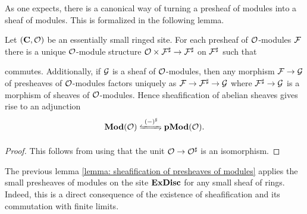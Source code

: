 As one expects, there is a canonical way of turning a presheaf of modules into a sheaf of modules. This is formalized in the following lemma.
\begin{lemma}
	\label{lemma: sheafification of presheaves of modules}
	
	Let $({{\mathbf{C}}}, {\mathcal{O}})$ be an essentially small ringed site. For each presheaf of ${\mathcal{O}}$-modules ${\mathcal{F}}$ there is a unique ${\mathcal{O}}$-module structure ${\mathcal{O}}\times {\mathcal{F}}^\sharp \to {\mathcal{F}}^\sharp$ on ${\mathcal{F}}^\sharp$ such that
	\begin{center}
	\end{center}
	commutes. Additionally, if ${\mathcal{G}}$ is a sheaf of ${\mathcal{O}}$-modules, then any morphism ${\mathcal{F}}\to{\mathcal{G}}$ of presheaves of ${\mathcal{O}}$-modules factors uniquely as ${\mathcal{F}}\to {\mathcal{F}}^\sharp\to{\mathcal{G}}$ where ${\mathcal{F}}^\sharp \to {\mathcal{G}}$ is a morphism of sheaves of ${\mathcal{O}}$-modules. Hence sheafification of abelian sheaves gives rise to an adjunction
		$$\mod\structsymbol \xleftrightarrows{\sheafification{-}}{} \pMod\structsymbol.$$
\end{lemma}
\begin{proof}
	This follows from \cite[\href{https://stacks.math.columbia.edu/tag/03CY}{Tag 03CY}]{stacks-project} using that the unit ${\mathcal{O}}\to{\mathcal{O}} ^\sharp$ is an isomorphism.
\end{proof}

\begin{remark}
	The previous lemma \ref{lemma: sheafification of presheaves of modules} applies the small presheaves of modules on the site ${\mathbf{ExDisc}}$ for any small sheaf of rings. Indeed, this is a direct consequence of the existence of sheafification and its commutation with finite limits.
\end{remark}

